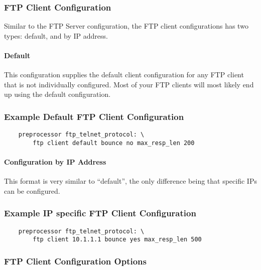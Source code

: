 \documentclass[english]{report}
\begin{document}
\subsubsection{FTP Client Configuration}

Similar to the FTP Server configuration, the FTP client configurations has two
types: default, and by IP address.

\paragraph{Default}

This configuration supplies the default client configuration for any FTP client
that is not individually configured.  Most of your FTP clients will most likely
end up using the default configuration.

\subsubsection{Example Default FTP Client Configuration}
\begin{verbatim}
    preprocessor ftp_telnet_protocol: \
        ftp client default bounce no max_resp_len 200
\end{verbatim}

\paragraph{Configuration by IP Address}

This format is very similar to ``default'', the only difference being that
specific IPs can be configured.

\subsubsection{Example IP specific FTP Client Configuration}

\begin{verbatim}
    preprocessor ftp_telnet_protocol: \
        ftp client 10.1.1.1 bounce yes max_resp_len 500
\end{verbatim}

\subsubsection{FTP Client Configuration Options}
\end{document}
